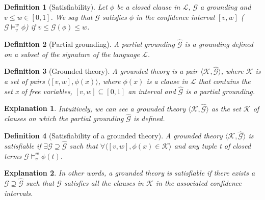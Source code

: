 \documentclass{article}
\newtheorem{definition}{Definition}[section]
\newtheorem{explanado}{Explanation}[section]
\begin{document}
\begin{definition}[Satisfiability]
Let $\phi$ be a closed clause in $\mathcal{L}$, $\mathcal{G}$ a grounding and $v \leq w \in [0, 1]$. We say that $\mathcal{G}$ satisfies $\phi$ in the confidence interval $[v, w]$ ($\mathcal{G} \models_v^w \phi$) if $v \leq \mathcal{G}(\phi) \leq w$. \cite{LTN}
\end{definition}

\begin{definition}[Partial grounding]
A partial grounding $\widehat{\mathcal{G}}$ is a grounding defined on a subset of the signature of the language $\mathcal{L}$. \cite{LTN}
\end{definition}

\begin{definition}[Grounded theory]
A grounded theory is a pair $\langle \mathcal{K},  \widehat{\mathcal{G}} \rangle$, where $\mathcal{K}	$ is a set of pairs $\langle [v, w], \phi(x) \rangle$, where $\phi(x)$ is a clause in $\mathcal{L}$ that contains the set x of free variables, $[v, w] \subseteq [0, 1]$ an interval and $\widehat{\mathcal{G}}$ is a partial grounding. \cite{LTN}
\end{definition}

\begin{explanado}
Intuitively, we can see a grounded theory $\langle \mathcal{K},  \widehat{\mathcal{G}} \rangle$ as the set $\mathcal{K}$ of clauses on which the partial grounding $\widehat{\mathcal{G}}$ is defined. \cite{LTN}
\end{explanado}

\begin{definition}[Satisfiability of a grounded theory]
A grounded theory $\langle \mathcal{K},  \widehat{\mathcal{G}} \rangle$ is satisfiable if
 $\exists \mathcal{G} \supseteq \widehat{\mathcal{G}}$ such that $\forall \langle [v, w], \phi(x) \in \mathcal{K} \rangle$ and any tuple t of closed terms $\mathcal{G} \models_v^w \phi(t)$. \cite{LTN}
\end{definition}

\begin{explanado}
In other words, a grounded theory is satisfiable if there exists a $\mathcal{G} \supseteq \widehat{\mathcal{G}}$ such that $\mathcal{G}$ satisfies all the clauses in $\mathcal{K}$ in the associated confidence intervals. \cite{LTN}
\end{explanado}
\end{document}
